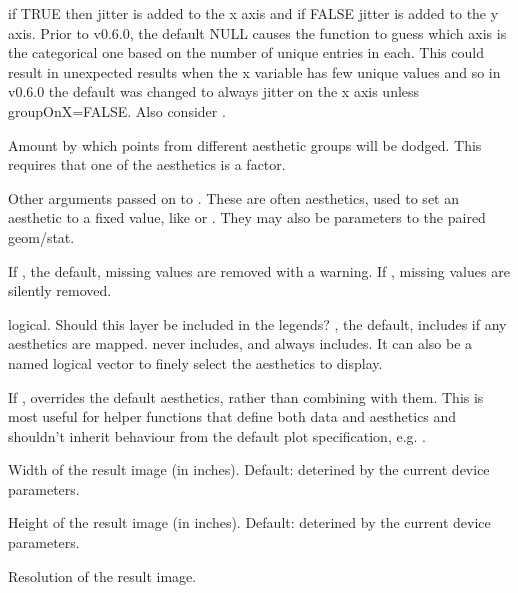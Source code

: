 \documentclass[a4paper]{book}
\begin{document}
\begin{Arguments}
\begin{ldescription}
\item[\code{groupOnX}] if TRUE then jitter is added to the x axis and if FALSE jitter is added to the y axis. Prior to v0.6.0, the default NULL causes the function to guess which axis is the categorical one based on the number of unique entries in each. This could result in unexpected results when the x variable has few unique values and so in v0.6.0 the default was changed to always jitter on the x axis unless groupOnX=FALSE. Also consider .

\item[\code{dodge.width}] Amount by which points from different aesthetic groups will be dodged. This requires that one of the aesthetics is a factor.

\item[\code{...}] Other arguments passed on to . These are
often aesthetics, used to set an aesthetic to a fixed value, like
 or . They may also be parameters
to the paired geom/stat.

\item[\code{na.rm}] If , the default, missing values are removed with
a warning. If , missing values are silently removed.

\item[\code{show.legend}] logical. Should this layer be included in the legends?
, the default, includes if any aesthetics are mapped.
 never includes, and  always includes.
It can also be a named logical vector to finely select the aesthetics to
display.

\item[\code{inherit.aes}] If , overrides the default aesthetics,
rather than combining with them. This is most useful for helper functions
that define both data and aesthetics and shouldn't inherit behaviour from
the default plot specification, e.g. .

\item[\code{raster.width}] Width of the result image (in inches). Default: deterined by the current device parameters.

\item[\code{raster.height}] Height of the result image (in inches). Default: deterined by the current device parameters.

\item[\code{raster.dpi}] Resolution of the result image.
\end{ldescription}
\end{Arguments}
\end{document}
